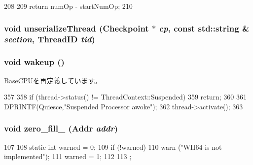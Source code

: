 \begin{DoxyCode}
208     {
209         return numOp - startNumOp;
210     }
\end{DoxyCode}
\hypertarget{classBaseSimpleCPU_a5122e6d6fdbdb3cb9ba72ae970f00a9e}{
\subsubsection[{unserializeThread}]{\setlength{\rightskip}{0pt plus 5cm}void unserializeThread ({\bf Checkpoint} $\ast$ {\em cp}, \/  const std::string \& {\em section}, \/  {\bf ThreadID} {\em tid})}}
\label{classBaseSimpleCPU_a5122e6d6fdbdb3cb9ba72ae970f00a9e}
\hypertarget{classBaseSimpleCPU_ae674290a26ecbd622c5160e38e8a4fe9}{
\subsubsection[{wakeup}]{\setlength{\rightskip}{0pt plus 5cm}void wakeup ()}}
\label{classBaseSimpleCPU_ae674290a26ecbd622c5160e38e8a4fe9}


\hyperlink{classBaseCPU_a75101f8aee74078c8c3c1d1f3617f7cc}{BaseCPU}を再定義しています。


\begin{DoxyCode}
357 {
358     if (thread->status() != ThreadContext::Suspended)
359         return;
360 
361     DPRINTF(Quiesce,"Suspended Processor awoke\n");
362     thread->activate();
363 }
\end{DoxyCode}
\hypertarget{classBaseSimpleCPU_ab009616bac40c9b920ed54fccca517a9}{
\subsubsection[{zero\_\-fill\_\-64}]{\setlength{\rightskip}{0pt plus 5cm}void zero\_\-fill\_ ({\bf Addr} {\em addr})}}
\label{classBaseSimpleCPU_ab009616bac40c9b920ed54fccca517a9}



\begin{DoxyCode}
107                                  {
108       static int warned = 0;
109       if (!warned) {
110         warn ("WH64 is not implemented");
111         warned = 1;
112       }
113     };
\end{DoxyCode}


